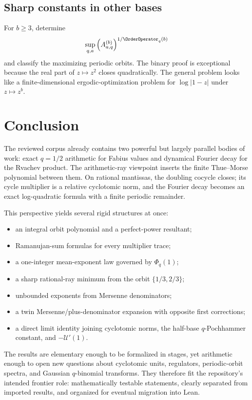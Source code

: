 \documentclass[11pt,oneside]{article}
\theoremstyle{definition}
\theoremstyle{remark}
\begin{document}
\subsection{Sharp constants in other bases}

For $b\ge3$, determine
\[
 \sup_{q,a}\left(A_{a,q}^{(b)}\right)^{1/\OrderOperator_q(b)}
\]
and classify the maximizing periodic orbits. The binary proof is exceptional
because the real part of $z\mapsto z^2$ closes quadratically. The general problem
looks like a finite-dimensional ergodic-optimization problem for
$\log|1-z|$ under $z\mapsto z^b$.

\section{Conclusion}\label{p2:sec:conclusion}

The reviewed corpus already contains two powerful but largely parallel bodies of
work: exact $q=1/2$ arithmetic for Fabius values and dynamical Fourier decay for the
Rvachev product. The arithmetic-ray viewpoint inserts the finite Thue--Morse
polynomial between them. On rational mantissas, the doubling cocycle closes; its
cycle multiplier is a relative cyclotomic norm, and the Fourier decay becomes an
exact log-quadratic formula with a finite periodic remainder.

This perspective yields several rigid structures at once:
\begin{itemize}
 \item an integral orbit polynomial and a perfect-power resultant;
 \item Ramanujan-sum formulas for every multiplier trace;
 \item a one-integer mean-exponent law governed by $\Phi_q(1)$;
 \item a sharp rational-ray minimum from the orbit $\{1/3,2/3\}$;
 \item unbounded exponents from Mersenne denominators;
 \item a twin Mersenne/plus-denominator expansion with opposite first corrections;
 \item a direct limit identity joining cyclotomic norms, the half-base
 $q$-Pochhammer constant, and $-\mathscr U'(1)$.
\end{itemize}
The results are elementary enough to be formalized in stages, yet arithmetic enough
to open new questions about cyclotomic units, regulators, periodic-orbit spectra,
and Gaussian $q$-binomial transforms. They therefore fit the repository's intended
frontier role: mathematically testable statements, clearly separated from imported
results, and organized for eventual migration into Lean.
\end{document}
